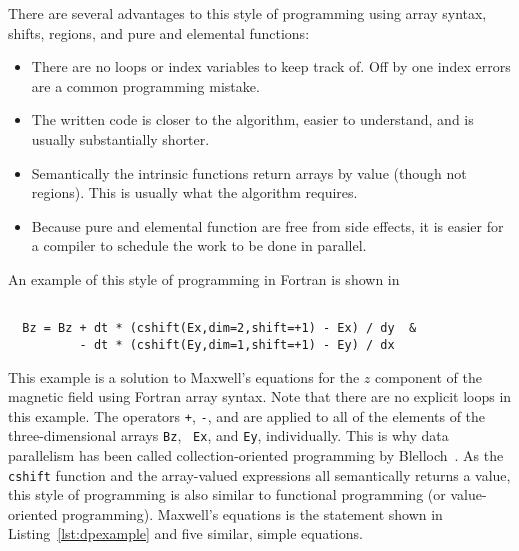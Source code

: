 \documentclass[10pt, conference, compsocconf]{IEEEtran}
\begin{document}


There are several advantages to this style of programming using array syntax, shifts, regions,
and pure and elemental functions:

\begin{itemize}
	\item There are no loops or index variables to keep track of.  Off by one
index errors are a common programming mistake.
        \item The written code is closer to the algorithm, easier to understand, and is usually substantially shorter.
	\item Semantically the intrinsic functions return arrays by value (though not regions).  This is usually what the algorithm requires.
	\item Because pure and elemental function are free from side effects, it is easier for a compiler to schedule the work to be done in parallel.
\end{itemize}

An example of this style of programming in Fortran is shown in

\begin{verbatim}

  Bz = Bz + dt * (cshift(Ex,dim=2,shift=+1) - Ex) / dy  &
          - dt * (cshift(Ey,dim=1,shift=+1) - Ey) / dx

\end{verbatim}

This example is a solution to Maxwell's equations for the $z$ component of the
magnetic field using Fortran array syntax.  Note that there are no explicit
loops in this example.  The operators {\tt +}, {\tt -}, and {\tt *} are
applied to all of the elements of the three-dimensional arrays {\tt Bz}, {\tt
  Ex}, and {\tt Ey}, individually.  This is why data parallelism has been
called collection-oriented programming by
Blelloch~\cite{blelloch90,rajopadhyedidlacs}.  As the {\tt cshift} function
and the array-valued expressions all semantically returns a value, this style
of programming is also similar to functional programming (or value-oriented
programming). %
Maxwell's equations is the statement shown in Listing~\ref{lst:dpexample} and
five similar, simple equations.

\end{document}
